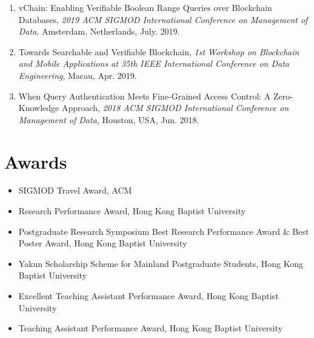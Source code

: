 \documentclass{mycv}
\begin{document}
\begin{enumerate}
  \item vChain: Enabling Verifiable Boolean Range Queries over Blockchain Databases, \emph{2019 ACM SIGMOD International Conference on Management of Data}, Amsterdam, Netherlands, July. 2019.
  \item Towards Searchable and Verifiable Blockchain, \emph{1st Workshop on Blockchain and Mobile Applications at 35th IEEE International Conference on Data Engineering}, Macau, Apr. 2019.
  \item When Query Authentication Meets Fine-Grained Access Control: A Zero-Knowledge Approach, \emph{2018 ACM SIGMOD International Conference on Management of Data}, Houston, USA, Jun. 2018.
\end{enumerate}

\section{Awards}

\begin{itemize}
  \item SIGMOD Travel Award, ACM 
  \item Research Performance Award, Hong Kong Baptist University 
  \item Postgraduate Research Symposium Best Research Performance Award \& Best Poster Award, Hong Kong Baptist University 
  \item Yakun Scholarship Scheme for Mainland Postgraduate Students, Hong Kong Baptist University 
  \item Excellent Teaching Assistant Performance Award, Hong Kong Baptist University 
  \item Teaching Assistant Performance Award, Hong Kong Baptist University 
\end{itemize}
\end{document}
